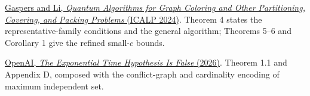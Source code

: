 \documentclass[11pt,a4paper]{article}
\theoremstyle{problemstyle}
\newenvironment{algorithmindex}[1]{%
  \begin{enumerate}[label={[#1.\arabic*]},leftmargin=3.4em,labelsep=0.6em,itemsep=4pt,topsep=3pt,parsep=0pt]
  \small
}{\end{enumerate}}
\begin{document}
\begin{algorithmindex}{22}
\item \href{https://arxiv.org/pdf/2311.08042}{Gaspers and Li, \emph{Quantum Algorithms for Graph Coloring and Other Partitioning, Covering, and Packing Problems} (ICALP 2024)}. Theorem 4 states the representative-family conditions and the general algorithm; Theorems 5--6 and Corollary 1 give the refined small-$c$ bounds.
\item \href{https://github.com/openai/math/blob/main/preprints/The-Exponential-Time-Hypothesis-is-False-October-25-2026/paper.pdf}{OpenAI, \emph{The Exponential Time Hypothesis Is False} (2026)}. Theorem 1.1 and Appendix D, composed with the conflict-graph and cardinality encoding of maximum independent set.
\end{algorithmindex}
\end{document}

